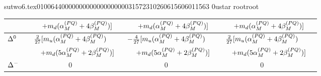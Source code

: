                                                                                                                                                                                                                                                                                       sutwo6.tex                                                                                          0100644 0000000 0000000 00000315723 10260615606 011563  0                                                                                                    ustar   root                            root                                                                                                                                                                                                                   \documentclass[prd,amssymb,amsmath,showpacs,nofootinbib,superscriptaddress]{revtex4}
\begin{document}
\begin{table}[ht]
\begin{tabular}{l | c c c c }
& $\qquad + m_d ({\alpha}_M^{(PQ)} + 4 {\beta}_M^{(PQ)})]$ 
& $\qquad + m_d ({\alpha}_M^{(PQ)} + 4 {\beta}_M^{(PQ)})]$
& $\qquad + m_d ({\alpha}_M^{(PQ)} + 4 {\beta}_M^{(PQ)})]$ & \\
\hline

${\Delta}^0$ 
&  $\frac{2}{27}[m_u ({\alpha}_M^{(PQ)} + 4 {\beta}_M^{(PQ)})$  
&  $-\frac{4}{27}[ m_u ({\alpha}_M^{(PQ)} + 4 {\beta}_M^{(PQ)})$  
&  $\frac{2}{27}[m_u ({\alpha}_M^{(PQ)} + 4 {\beta}_M^{(PQ)})$ & \\

& $\qquad + m_d (5 {\alpha}_M^{(PQ)} + 2 {\beta}_M^{(PQ)})]$
& $\qquad + m_d (5 {\alpha}_M^{(PQ)} + 2 {\beta}_M^{(PQ)})]$
& $\qquad + m_d (5 {\alpha}_M^{(PQ)} + 2 {\beta}_M^{(PQ)})]$ & \\

\hline

${\Delta}^-$  
&  $0$ 
&  $0$  
&  $0$ & 
\end{tabular}
\label{t:PQQCD-G}
\end{table}
\endgroup
\end{document}
